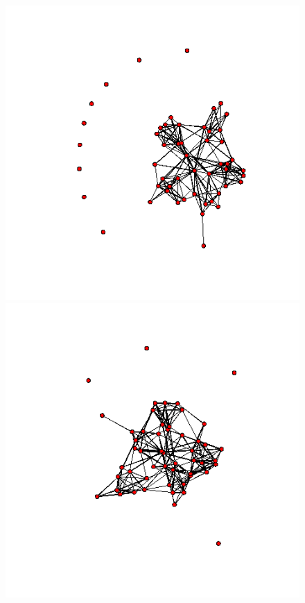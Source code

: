 \documentclass[aspectratio=169,ignorenonframetext,9pt]{beamer}
\theoremstyle{plain}
\theoremstyle{definition}
\begin{document}
\begin{figure}[h]
    \begin{center}
    \includegraphics[scale=0.23]{pictures/m1_19_nework.png}
    \includegraphics[scale=0.23]{pictures/w1_19_nework.png}

\end{center}
\end{figure}
\end{document}
